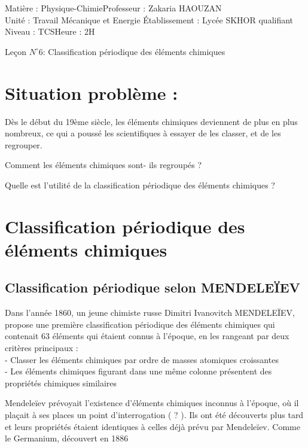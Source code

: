 \documentclass[12pt]{article}
\author{Zakaria HAOUZAN}
\date{\today}
\newcommand\headerMe[2]{\noindent{}#1\hfill#2}
\begin{document}
\headerMe{Matière : Physique-Chimie}{Professeur : Zakaria HAOUZAN}\\
\headerMe{Unité : Travail Mécanique et Energie }{Établissement : Lycée SKHOR qualifiant}\\
\headerMe{Niveau : TCS}{Heure : 2H}\\

\begin{center}

    \Large{Leçon $N^{\circ} 6 $: \color{red} Classification périodique des éléments chimiques }
\end{center}


\section{Situation problème :  }
Dès le début du 19ème siècle, les éléments
chimiques deviennent de plus en plus
nombreux, ce qui a poussé les scientifiques à
essayer de les classer, et de les regrouper.

Comment les éléments chimiques sont-
ils regroupés ?

Quelle est l’utilité de la classification
périodique des éléments chimiques ?

\section{Classification périodique des éléments chimiques }
\subsection{Classification périodique selon
MENDELEÏEV }

Dans l'année 1860, un jeune chimiste russe Dimitri
Ivanovitch MENDELEÏEV, propose une première
classification périodique des éléments chimiques qui
contenait 63 éléments qui étaient connus à l’époque,
en les rangeant par deux critères principaux :
\\ - Classer les éléments chimiques par ordre de
masses atomiques croissantes
\\ - Les éléments chimiques figurant dans une même
colonne présentent des propriétés chimiques
similaires

Mendeleïev prévoyait l’existence d’éléments
chimiques inconnus à l’époque, où il plaçait à ses
places un point d’interrogation ( ? ). Ils ont été
découverts plus tard et leurs propriétés étaient
identiques à celles déjà prévu par Mendeleïev. Comme
le Germanium, découvert en 1886
\end{document}
